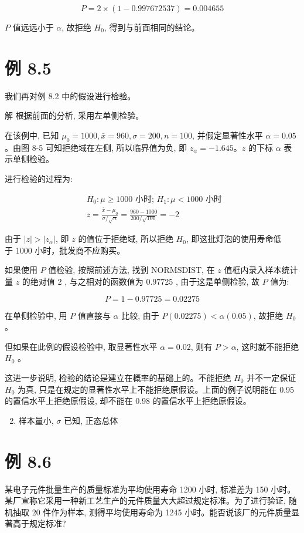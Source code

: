 \documentclass[10pt]{article}
\begin{document}
\begin{CJK*}{UTF8}{bsmi}
$$
P=2 \times(1-0.997672537)=0.004655
$$

$P$ 值远远小于 $\alpha$, 故拒绝 $H_{0}$, 得到与前面相同的结论。

\section*{例 8.5}
我们再对例 8.2 中的假设进行检验。

解 根据前面的分析, 采用左单侧检验。

在该例中, 已知 $\mu_{0}=1000, \bar{x}=960, \sigma=200, n=100$, 并假定显著性水平 $\alpha=0.05$ 。由图 8-5 可知拒绝域在左侧, 所以临界值为负, 即 $z_{\alpha}=-1.645 。 z$ 的下标 $\alpha$ 表示单侧检验。

进行检验的过程为:

$$
\begin{aligned}
& H_{0}: \mu \geqslant 1000 \text { 小时; } H_{1}: \mu<1000 \text { 小时 } \\
& z=\frac{\bar{x}-\mu_{0}}{\sigma / \sqrt{n}}=\frac{960-1000}{200 / \sqrt{100}}=-2
\end{aligned}
$$

由于 $|z|>\left|z_{\alpha}\right|$, 即 $z$ 的值位于拒绝域, 所以拒绝 $H_{0}$, 即这批灯泡的使用寿命低\\
于 1000 小时，批发商不应购买。

如果使用 $P$ 值检验, 按照前述方法, 找到 NORMSDIST, 在 $z$ 值框内录入样本统计量 $z$ 的绝对值 2 , 与之相对的函数值为 0.97725 , 由于这是单侧检验, 故 $P$ 值为:

$$
P=1-0.97725=0.02275
$$

在单侧检验中, 用 $P$ 值直接与 $\alpha$ 比较, 由于 $P(0.02275)<\alpha(0.05)$, 故拒绝 $H_{0}$ 。

但如果在此例的假设检验中, 取显著性水平 $\alpha=0.02$, 则有 $P>\alpha$, 这时就不能拒绝 $H_{0}$ 。

这进一步说明, 检验的结论是建立在概率的基础上的。不能拒绝 $H_{0}$ 并不一定保证 $H_{0}$ 为真, 只是在规定的显著性水平上不能拒绝原假设。上面的例子说明能在 0.95 的置信水平上拒绝原假设, 却不能在 0.98 的置信水平上拒绝原假设。

\begin{enumerate}
  \setcounter{enumi}{1}
  \item 样本量小, $\sigma$ 已知, 正态总体
\end{enumerate}

\section*{例 8.6}
某电子元件批量生产的质量标准为平均使用寿命 1200 小时, 标准差为 150 小时。某厂宣称它采用一种新工艺生产的元件质量大大超过规定标准。为了进行验证, 随机抽取 20 件作为样本, 测得平均使用寿命为 1245 小时。能否说该厂的元件质量显著高于规定标准?


\end{CJK*}
\end{document}
